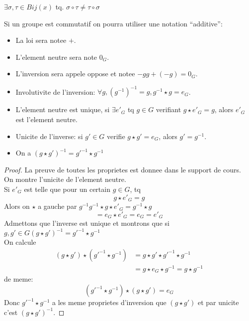 \documentclass[../main.tex]{subfiles}
\begin{document}

$\exists \sigma, \tau \in Bij(x)$ tq. $\sigma \circ \tau \neq \tau \circ \sigma$
\begin{defn}\label{defn:notation_additive}
	Si un groupe est commutatif on pourra utiliser une notation ``additive'':\\
\begin{itemize}
	\item 	La loi sera notee $+$.\\
	\item 	L'element neutre sera note $0_G$.\\
	\item 	L'inversion sera appele oppose et notee $-g  g + (-g)= 0_G$.
\end{itemize}
\end{defn}
\begin{propo}\label{propo:lois_de_groupe}
	\begin{itemize}
		\item Involutivite de l'inversion: $\forall g, ( g^{-1})^{-1}=g, g^{-1}\star g = e_G$.\\
		\item L'element neutre est unique, si $\exists e'_G$ tq $g\in G$ verifiant $g\star e'_G=g$, alors $e'_G$ est l'element neutre.\\
		\item Unicite de l'inverse: si $g'\in G$ verifie $g\star g'= e_G$, alors $g'=g^{-1}$.\\
		\item On a $ (g\star g')^{-1}=g'^{-1}\star g^{-1}$
	\end{itemize}
	
\end{propo}
\begin{proof}
La preuve de toutes les proprietes est donnee dans le support de cours.\\
On montre l'unicite de l'element neutre.\\
Si $e'_G$ est telle que pour un certain $g\in G$, tq
\[ 
g \star e'_G = g
\]
Alors on $\star$ a gauche par $g^{-1} g^{-1}\star g \star e'_G=g^{-1}\star g$  
\[ 
=e_G \star e'_G = e_G = e'_G
\]
Admettons que l'inverse est unique et montrons que si $g,g'\in G  ( g\star g')^{-1}=g'^{-1}\star g^{-1}$\\
On calcule
\begin{align*}
	( g\star g') \star ( g'^{-1}\star g^{-1}) &= g\star g' \star g'^{-1} \star g^{-1}\\
						  &= g \star e_G \star g^{-1}=g\star g^{-1}	
\end{align*}
de meme:
\[ 
 ( g'^{-1}\star g^{-1})\star ( g\star g') = e_G
 \]
 Donc $g'^{-1}\star g^{-1}$ a les meme proprietes d'inversion que $(g\star g')$ et par unicite c'est $ ( g\star g')^{-1}$.
\end{proof}
\end{document}
